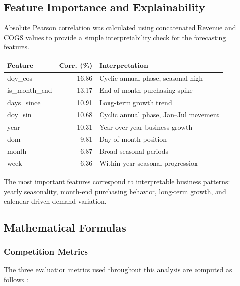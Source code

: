 \documentclass[12pt,a4paper]{article}
\begin{document}
\subsection{Feature Importance and Explainability}
\label{sec:feature-importance-explainability}

Absolute Pearson correlation was calculated using concatenated Revenue and COGS values to provide a simple interpretability check for the forecasting features.

\begin{center}
\centering
{}
\label{tab:feature-importance}
\small
\begin{tabular}{lrl}
\toprule
\textbf{Feature} & \textbf{Corr. (\%)} & \textbf{Interpretation} \\
\midrule
doy\_cos & 16.86 & Cyclic annual phase, seasonal high \\
is\_month\_end & 13.17 & End-of-month purchasing spike \\
days\_since & 10.91 & Long-term growth trend \\
doy\_sin & 10.68 & Cyclic annual phase, Jan--Jul movement \\
year & 10.31 & Year-over-year business growth \\
dom & 9.81 & Day-of-month position \\
month & 6.87 & Broad seasonal periods \\
week & 6.36 & Within-year seasonal progression \\
\bottomrule
\end{tabular}
\end{center}

The most important features correspond to interpretable business patterns: yearly seasonality, month-end purchasing behavior, long-term growth, and calendar-driven demand variation.

\subsection{Mathematical Formulas}
\label{sec:mathematical-formulas}

\subsubsection{Competition Metrics}

The three evaluation metrics used throughout this analysis are computed as follows \cite{Pedregosa2011}:
\end{document}
